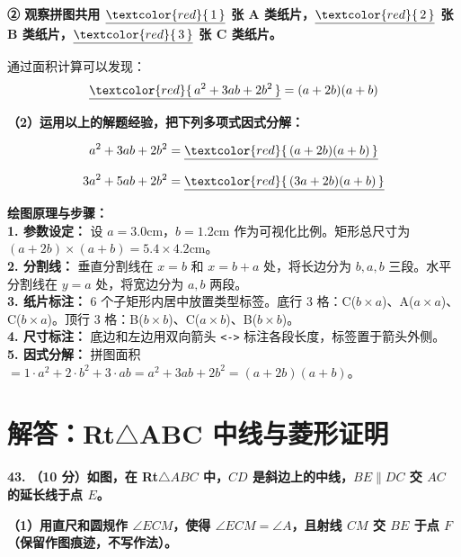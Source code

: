 \vspace{0.3cm}
\textbf{② 观察拼图共用 $\underline{\textcolor{red}{\,1\,}}$ 张 A 类纸片，$\underline{\textcolor{red}{\,2\,}}$ 张 B 类纸片，$\underline{\textcolor{red}{\,3\,}}$ 张 C 类纸片。}

通过面积计算可以发现：
$$\underline{\textcolor{red}{\,a^2 + 3ab + 2b^2\,}} = (a+2b)(a+b)$$

\vspace{0.3cm}
\textbf{（2）运用以上的解题经验，把下列多项式因式分解：}

$$a^2 + 3ab + 2b^2 = \underline{\textcolor{red}{\,(a+2b)(a+b)\,}}$$

$$3a^2 + 5ab + 2b^2 = \underline{\textcolor{red}{\,(3a+2b)(a+b)\,}}$$

\vspace{0.4cm}
{\small\color{blue!70!black}
\textbf{绘图原理与步骤：}\\
\textbf{1. 参数设定：} 设 $a = 3.0$cm，$b = 1.2$cm 作为可视化比例。矩形总尺寸为 $(a+2b) \times (a+b) = 5.4 \times 4.2$cm。\\
\textbf{2. 分割线：} 垂直分割线在 $x = b$ 和 $x = b + a$ 处，将长边分为 $b, a, b$ 三段。水平分割线在 $y = a$ 处，将宽边分为 $a, b$ 两段。\\
\textbf{3. 纸片标注：} 6 个子矩形内居中放置类型标签。底行 3 格：C($b \times a$)$、$A($a \times a$)$、$C($b \times a$)。顶行 3 格：B($b \times b$)$、$C($a \times b$)$、$B($b \times b$)。\\
\textbf{4. 尺寸标注：} 底边和左边用双向箭头 \texttt{<->} 标注各段长度，标签置于箭头外侧。\\
\textbf{5. 因式分解：} 拼图面积 $= 1 \cdot a^2 + 2 \cdot b^2 + 3 \cdot ab = a^2 + 3ab + 2b^2 = (a+2b)(a+b)$。
}

\newpage



\section{解答：Rt$\triangle$ABC 中线与菱形证明}

\vspace{0.6cm}

\textbf{\LARGE 43.} \textbf{（10 分）如图，在 Rt$\triangle ABC$ 中，$CD$ 是斜边上的中线，$BE \parallel DC$ 交 $AC$ 的延长线于点 $E$。}

\textbf{（1）用直尺和圆规作 $\angle ECM$，使得 $\angle ECM = \angle A$，且射线 $CM$ 交 $BE$ 于点 $F$（保留作图痕迹，不写作法）。}

